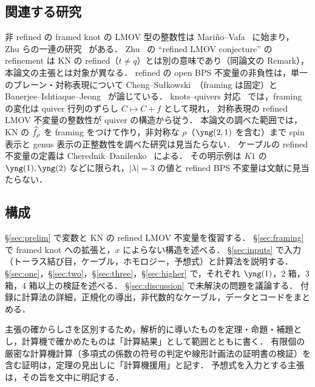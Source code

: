\subsection{関連する研究}
非 refined の framed knot の LMOV 型の整数性は Mariño--Vafa~\cite{Marino01} に始まり，
Zhu らの一連の研究~\cite{Zhu21,Luo16,Luo21,Wang25,Zhu25} がある．
Zhu~\cite{Zhu21} の ``refined LMOV conjecture'' の refinement は KN の refined（$t\neq q$）とは別の意味であり（同論文の Remark），本論文の主張とは対象が異なる．
refined の open BPS 不変量の非負性は，単一のブレーン・対称表現について Cheng--Sułkowski~\cite{Cheng21}（framing は固定）と
Banerjee--Ishtiaque--Jeong~\cite{Banerjee26} が論じている．
knots--quivers 対応~\cite{Kucharski17,Kucharski17b,Ekholm18} では，framing の変化は quiver 行列のずらし $C\mapsto C+f$ として現れ，
対称表現の refined LMOV 不変量の整数性が quiver の構造から従う．
本論文の調べた範囲では，KN の $\widehat{f}_\rho$ を framing をつけて作り，非対称な $\rho$（$\yng(2,1)$ を含む）まで spin 表示と genus 表示の正整数性を調べた研究は見当たらない．
ケーブルの refined 不変量の定義は Cherednik--Danilenko~\cite{Cherednik14,Cherednik15} による．
その明示例は $K1$ の $\yng(1),\yng(2)$ などに限られ，$|\lambda|=3$ の値と refined BPS 不変量は文献に見当たらない．

\subsection{構成}
\S\ref{sec:prelim} で変数と KN の refined LMOV 不変量を復習する．
\S\ref{sec:framing} で framed knot への拡張と，$x$ によらない構造を述べる．
\S\ref{sec:inputs} で入力（トーラス結び目，ケーブル，ホモロジー，予想式）と計算法を説明する．
\S\ref{sec:one}，\S\ref{sec:two}，\S\ref{sec:three}，\S\ref{sec:higher} で，それぞれ $\yng(1)$，2 箱，3 箱，4 箱以上の検証を述べる．
\S\ref{sec:discussion} で未解決の問題を議論する．
付録に計算法の詳細，正規化の導出，非代数的なケーブル，データとコードをまとめる．

主張の確からしさを区別するため，解析的に導いたものを定理・命題・補題とし，計算機で確かめたものは「計算結果」として範囲とともに書く．
有限個の厳密な計算機計算（多項式の係数の符号の判定や線形計画法の証明書の検証）を含む証明は，定理の見出しに「計算機援用」と記す．
予想式を入力とする主張は，その旨を文中に明記する．
